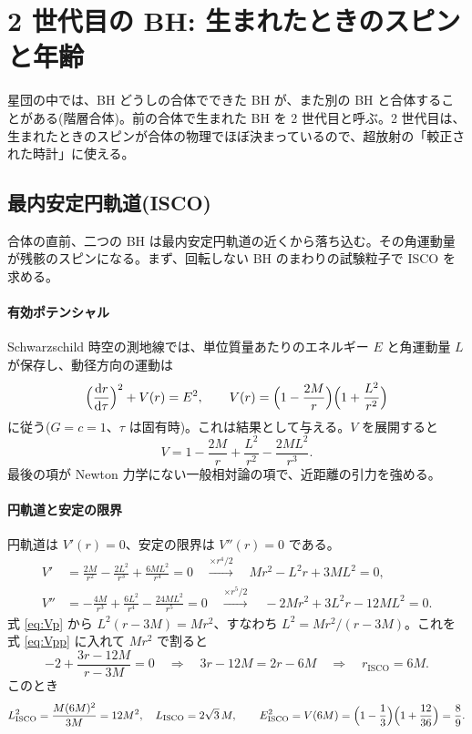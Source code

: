 \section{2 世代目の BH: 生まれたときのスピンと年齢}\label{sec:secondgen}

星団の中では、BH どうしの合体でできた BH が、また別の BH と合体することがある(階層合体)。前の合体で生まれた BH を 2 世代目と呼ぶ。2 世代目は、生まれたときのスピンが合体の物理でほぼ決まっているので、超放射の「較正された時計」に使える。

\subsection{最内安定円軌道(ISCO)}

合体の直前、二つの BH は最内安定円軌道の近くから落ち込む。その角運動量が残骸のスピンになる。まず、回転しない BH のまわりの試験粒子で ISCO を求める。

\paragraph{有効ポテンシャル}
Schwarzschild 時空の測地線では、単位質量あたりのエネルギー $E$ と角運動量 $L$ が保存し、動径方向の運動は
\begin{equation}
\Bigl(\frac{\mathrm{d} r}{\mathrm{d}\tau}\Bigr)^2+V(r)=E^2,\qquad V(r)=\Bigl(1-\frac{2M}{r}\Bigr)\Bigl(1+\frac{L^2}{r^2}\Bigr)
\end{equation}
に従う($G=c=1$、$\tau$ は固有時)。これは結果として与える。$V$ を展開すると
\begin{equation}
V=1-\frac{2M}{r}+\frac{L^2}{r^2}-\frac{2ML^2}{r^3}.
\end{equation}
最後の項が Newton 力学にない一般相対論の項で、近距離の引力を強める。

\paragraph{円軌道と安定の限界}
円軌道は $V'(r)=0$、安定の限界は $V''(r)=0$ である。
\begin{align}
V'&=\frac{2M}{r^2}-\frac{2L^2}{r^3}+\frac{6ML^2}{r^4}=0
\quad\xrightarrow{\times r^4/2}\quad Mr^2-L^2r+3ML^2=0,
\label{eq:Vp}\\
V''&=-\frac{4M}{r^3}+\frac{6L^2}{r^4}-\frac{24ML^2}{r^5}=0
\quad\xrightarrow{\times r^5/2}\quad -2Mr^2+3L^2r-12ML^2=0.
\label{eq:Vpp}
\end{align}
式 \eqref{eq:Vp} から $L^2(r-3M)=Mr^2$、すなわち $L^2=Mr^2/(r-3M)$。これを式 \eqref{eq:Vpp} に入れて $Mr^2$ で割ると
\begin{equation}
-2+\frac{3r-12M}{r-3M}=0\quad\Longrightarrow\quad 3r-12M=2r-6M\quad\Longrightarrow\quad r_\mathrm{ISCO}=6M.
\end{equation}
このとき
\begin{equation}
L_\mathrm{ISCO}^2=\frac{M(6M)^2}{3M}=12M^2,\quad L_\mathrm{ISCO}=2\sqrt3\,M,\qquad
E_\mathrm{ISCO}^2=V(6M)=\Bigl(1-\frac13\Bigr)\Bigl(1+\frac{12}{36}\Bigr)=\frac89.
\end{equation}

